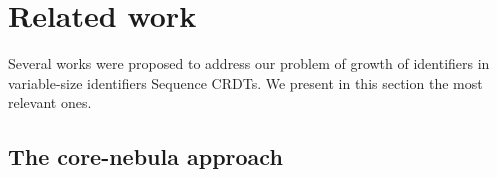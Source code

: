 \documentclass[10pt,journal,compsoc]{IEEEtran}
\begin{document}



\section{Related work}
\label{sec:related-work}

Several works were proposed to address our problem of growth of identifiers in variable-size identifiers Sequence \acp{CRDT}.
We present in this section the most relevant ones.

\subsection{The core-nebula approach}
\end{document}
